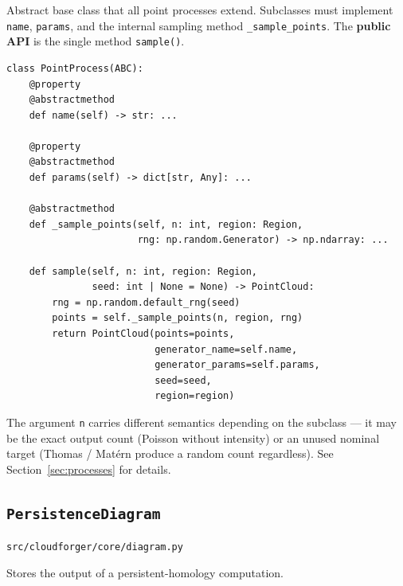 \documentclass[11pt, a4paper]{article}
\newcommand{\code}[1]{\texttt{#1}}
\newcommand{\pyfile}[1]{\texttt{\small #1}}
\newcommand{\typename}[1]{\textbf{\texttt{#1}}}
\begin{document}
Abstract base class that all point processes extend.
Subclasses must implement \code{name}, \code{params},
and the internal sampling method \code{\_sample\_points}.
The \textbf{public API} is the single method \code{sample()}.

\begin{lstlisting}
class PointProcess(ABC):
    @property
    @abstractmethod
    def name(self) -> str: ...

    @property
    @abstractmethod
    def params(self) -> dict[str, Any]: ...

    @abstractmethod
    def _sample_points(self, n: int, region: Region,
                       rng: np.random.Generator) -> np.ndarray: ...

    def sample(self, n: int, region: Region,
               seed: int | None = None) -> PointCloud:
        rng = np.random.default_rng(seed)
        points = self._sample_points(n, region, rng)
        return PointCloud(points=points,
                          generator_name=self.name,
                          generator_params=self.params,
                          seed=seed,
                          region=region)
\end{lstlisting}

The argument \code{n} carries different semantics depending on the
subclass --- it may be the exact output count (Poisson without
intensity) or an unused nominal target (Thomas / Matérn produce a
random count regardless).  See Section~\ref{sec:processes} for details.

\subsection{\typename{PersistenceDiagram}}
\label{subsec:diagram}
\pyfile{src/cloudforger/core/diagram.py}

Stores the output of a persistent-homology computation.
\end{document}
